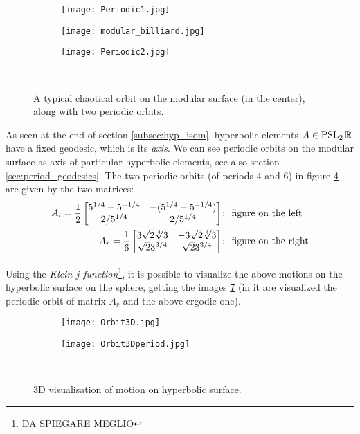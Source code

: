 \begin{figure}[H]
\centering
  \begin{subfigure}[b]{0.3\textwidth}
  \centering
    \texttt{[image: Periodic1.jpg]}
    \label{fig:mod_period_1}
  \end{subfigure}
  \begin{subfigure}[b]{0.3\textwidth}
  \centering
    \texttt{[image: modular\_billiard.jpg]}
    \label{fig:mod_erg}
  \end{subfigure}
    \begin{subfigure}[b]{0.3\textwidth}
  \centering
    \texttt{[image: Periodic2.jpg]}
    \label{fig:mod_period_2}
  \end{subfigure}	
  \noindent\\
  \decoRule
  \caption{A typical chaotical orbit on the modular surface (in the center), along with two periodic orbits.}
  \label{fig:modular_orbits}
\end{figure}


As seen at the end of section \ref{subsec:hyp_isom}, hyperbolic elements $A\in\operatorname{PSL}_{2}\mathbb{R}$ have a fixed geodesic, which is its \emph{axis}. We can see periodic orbits on the modular surface as axis of particular hyperbolic elements, see also section \ref{sec:period_geodesics}. The two periodic orbits (of periods $4$ and $6$) in figure \ref{fig:modular_orbits} are given by the two matrices:
\begin{align*}
A_{l}=\frac{1}{2}\begin{bmatrix} 5^{1/4}-5^{-1/4}&-(5^{1/4}-5^{-1/4})\\
2/5^{1/4}&2/5^{1/4} \end{bmatrix}&\colon\text{ figure on the left}\\
A_{r}=\frac{1}{6}\begin{bmatrix} 3\sqrt{2}\sqrt[4]{3}&-3\sqrt{2}\sqrt[4]{3}\\
\sqrt{2}3^{3/4}&\sqrt{2}3^{3/4} \end{bmatrix}&\colon\text{ figure on the right}
\end{align*}


Using the \emph{Klein $j$-function}\footnote{DA SPIEGARE MEGLIO}, it is possible to visualize the above motions on the hyperbolic surface on the sphere, getting the images \ref{fig:modular_orbits_3d} (in it are visualized the periodic orbit of matrix $A_{r}$ and the above ergodic one).


\begin{figure}[H]
\centering
  \begin{subfigure}[b]{0.3\textwidth}
  \centering
    \texttt{[image: Orbit3D.jpg]}
    \label{fig:mod_3d_erg}
  \end{subfigure}
  \begin{subfigure}[b]{0.3\textwidth}
  \centering
    \texttt{[image: Orbit3Dperiod.jpg]}
    \label{fig:mod_3d_period}
  \end{subfigure}
  \noindent\\
  \decoRule
  \caption{3D visualisation of motion on hyperbolic surface.}
  \label{fig:modular_orbits_3d}
\end{figure}


